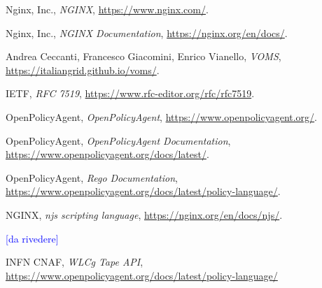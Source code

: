 \begin{thebibliography}{99}

	Nginx, Inc.,
	\textit{NGINX},
	\url{https://www.nginx.com/}.

	Nginx, Inc.,
	\textit{NGINX Documentation},
	\url{https://nginx.org/en/docs/}.

	Andrea Ceccanti, Francesco Giacomini, Enrico Vianello,
	\textit{VOMS},
	\url{https://italiangrid.github.io/voms/}.

	IETF,
	\textit{RFC 7519},
	\url{https://www.rfc-editor.org/rfc/rfc7519}.

	OpenPolicyAgent,
	\textit{OpenPolicyAgent},
	\url{https://www.openpolicyagent.org/}.

	OpenPolicyAgent,
	\textit{OpenPolicyAgent Documentation},
	\url{https://www.openpolicyagent.org/docs/latest/}.

	OpenPolicyAgent,
	\textit{Rego Documentation},
	\url{https://www.openpolicyagent.org/docs/latest/policy-language/}.

	NGINX,
	\textit{njs scripting language},
	\url{https://nginx.org/en/docs/njs/}.

	\textcolor{blue}{[da rivedere]}
    
	INFN CNAF,
	\textit{WLCg Tape API},
	\url{https://www.openpolicyagent.org/docs/latest/policy-language/}

\end{thebibliography}